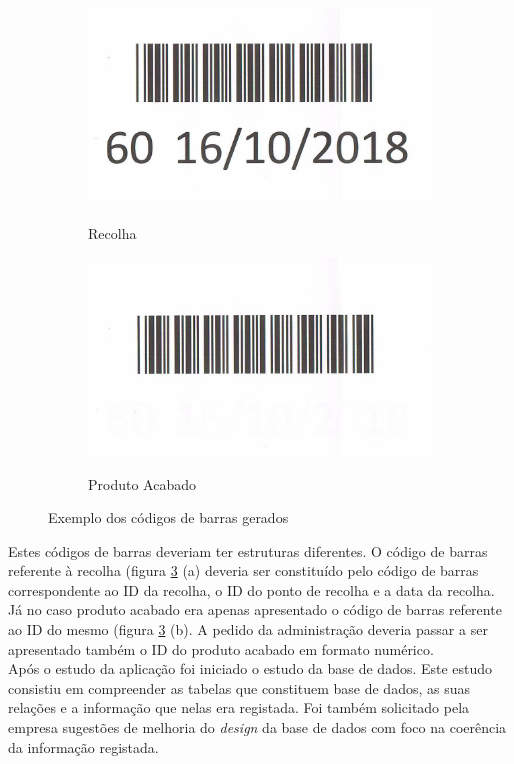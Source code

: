 \begin{figure}[H]
	\centering
	
	\begin{subfigure}[t]{0.4\linewidth}
		\includegraphics[width=\linewidth]{figuras/AppAccess/2-CodBarras.jpg}
		\label{fig:app_access_cb_recolha}
		\caption{Recolha}
	\end{subfigure}
	\begin{subfigure}[t]{0.4\linewidth}
		\includegraphics[width=\linewidth]{figuras/AppAccess/5-CodBarras.jpg}
		\label{fig:app_access_cb_prod_acabado}
		\caption{Produto Acabado}
	\end{subfigure}
	
	\caption{Exemplo dos códigos de barras gerados}
	\label{fig:app_access_cb}
\end{figure}
\noindent
Estes códigos de barras deveriam ter estruturas diferentes. O código de barras referente à recolha (figura \ref{fig:app_access_cb} (a) deveria ser constituído pelo código de barras correspondente ao ID da recolha, o ID do ponto de recolha e a data da recolha. Já no caso produto acabado era apenas apresentado o código de barras referente ao ID do mesmo (figura \ref{fig:app_access_cb} (b). A pedido da administração deveria passar a ser apresentado também o ID do produto acabado em formato numérico.\\
Após o estudo da aplicação foi iniciado o estudo da base de dados. Este estudo consistiu em compreender as tabelas que constituem base de dados, as suas relações e a informação que nelas era registada. Foi também solicitado pela empresa sugestões de melhoria do \textit{design} da base de dados com foco na coerência da informação registada.

